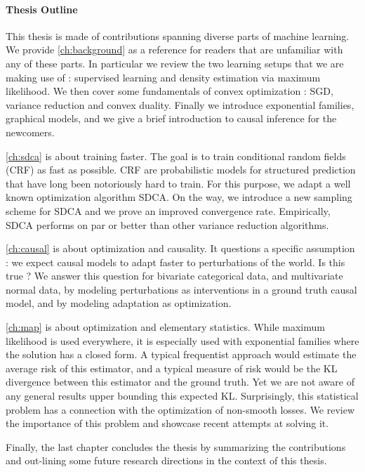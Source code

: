 \paragraph{Thesis Outline}
This thesis is made of contributions spanning diverse parts of machine learning.
We provide \cref{ch:background} as a reference for readers that are unfamiliar with any of these parts.
In particular we review the two learning setups that we are making use of : supervised learning and density estimation via maximum likelihood.
We then cover some fundamentals of convex optimization : SGD, variance reduction and convex duality.
Finally we introduce exponential families, graphical models, and we give a brief introduction to causal inference for the newcomers.

\cref{ch:sdca} is about training faster.
The goal is to train conditional random fields (CRF) as fast as possible.
CRF are probabilistic models for structured prediction that have long been notoriously hard to train.
For this purpose, we adapt a well known optimization algorithm SDCA.
On the way, we introduce a new sampling scheme for SDCA and we prove an improved convergence rate.
Empirically, SDCA performs on par or better than other variance reduction algorithms.

\cref{ch:causal} is about optimization and causality.
It questions a specific assumption : we expect causal models to adapt faster to perturbations of the world. Is this true ?
We answer this question for bivariate categorical data, and multivariate normal data, by modeling  perturbations as interventions in a ground truth causal model, and by modeling adaptation as optimization.

\cref{ch:map} is about optimization and elementary statistics.
While maximum likelihood is used everywhere, it is especially used with exponential families where the solution has a closed form.
A typical frequentist approach would estimate the average risk of this estimator, and a typical measure of risk would be the KL divergence between this estimator and the ground truth.
Yet we are not aware of any general results upper bounding this expected KL.
Surprisingly, this statistical problem has a connection with the optimization of non-smooth losses.
We review the importance of this problem and showcase recent attempts at solving it.

Finally, the last chapter concludes the thesis by summarizing the contributions and out-lining some future research directions in the context of this thesis.



